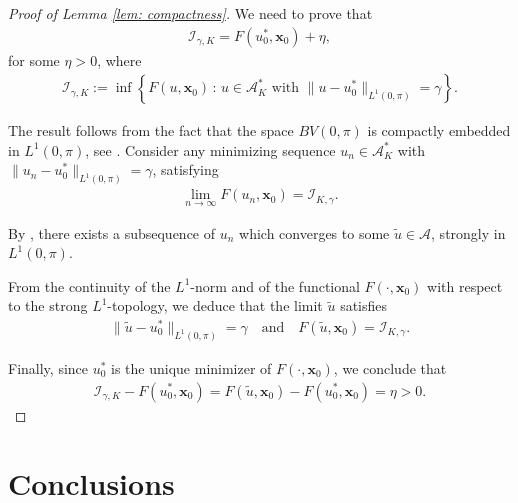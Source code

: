 \documentclass[9pt,shortpaper,twoside,web]{ieeecolor}
\begin{document}
\medskip
\begin{proof}[Proof of Lemma \ref{lem: compactness}]
	We need to prove that
	\begin{align*}
		\mathcal{I}_{\gamma,K} = F(u_0^\ast, \bm{x}_0) + \eta,	
	\end{align*}
	for some $\eta>0$, where
	\begin{align*}
		\mathcal{I}_{\gamma,K} :=  \inf \left\{ F(u, \bm{x}_0) \,: \, u\in \mathcal{A}_K^\ast  \text{ with } \|u- u_0^\ast \|_{L^1(0,\pi)} = \gamma \right\}.
	\end{align*}
	
	The result follows from the fact that the space $BV(0,\pi)$ is compactly embedded in $L^1 (0,\pi)$, see \cite[Theorem 3.23]{ambrosio2000functions}.
	Consider any minimizing sequence $u_n\in \mathcal{A}_K^\ast$ with $\| u_n - u^\ast_0\|_{L^1(0,\pi)} =\gamma$, satisfying
	\begin{align*}
		\lim_{n\to\infty} F(u_n, \bm{x}_0) = \mathcal{I}_{K,\gamma}.
	\end{align*}
	
	By \cite[Theorem 3.23]{ambrosio2000functions}, there exists a subsequence of $u_n$ which converges to some $\tilde{u}\in \mathcal{A}$, strongly in $L^1(0,\pi)$.
	
	From the continuity of the $L^1$-norm and of the functional $F(\cdot, \bm{x}_0)$ with respect to the strong $L^1$-topology, we deduce that the limit $\tilde{u}$ satisfies
	\begin{align*}
		\| \tilde{u} - u_0^\ast \|_{L^1(0,\pi)} = \gamma \quad \text{and} \quad F(\tilde{u}, \bm{x}_0) = \mathcal{I}_{K,\gamma}.
	\end{align*}
	
	Finally, since $u_0^\ast$ is the unique minimizer of $F(\cdot, \bm{x}_0)$, we conclude that
	\begin{align*}
		\mathcal{I}_{\gamma, K} - F(u_0^\ast, \bm{x}_0) = F(\tilde{u}, \bm{x}_0) - F(u_0^\ast, \bm{x}_0) = \eta >0. 
	\end{align*}
\end{proof}

\section{Conclusions}\label{sec:conclusions}
\end{document}
